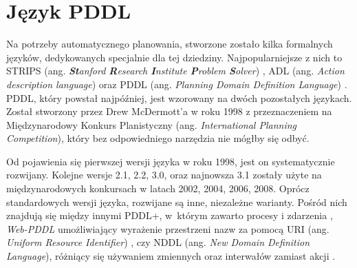 \section{Język PDDL}
\label{sec:jezykpddl}
Na potrzeby automatycznego planowania, stworzone zostało kilka formalnych języków, dedykowanych specjalnie dla tej dziedziny. Najpopularniejsze z nich to STRIPS (ang. \textit{\textbf{St}anford \textbf{R}esearch \textbf{I}nstitute \textbf{P}roblem \textbf{S}olver}) \cite{strips}, ADL (ang. \textit{Action description language}) \cite{adl} oraz PDDL (ang. \textit{Planning Domain Definition Language}) \cite{pddl}. PDDL, który powstał najpóźniej, jest wzorowany na dwóch pozostałych językach. Został stworzony przez Drew McDermott'a w roku 1998 z przeznaczeniem na Międzynarodowy Konkurs Planistyczny (ang. \textit{International Planning Competition}), który bez odpowiedniego narzędzia nie mógłby się odbyć.

Od pojawienia się pierwszej wersji języka w roku 1998, jest on systematycznie rozwijany. Kolejne wersje 2.1, 2.2, 3.0, oraz najnowsza 3.1 zostały użyte na międzynarodowych konkursach w latach 2002, 2004, 2006, 2008. Oprócz standardowych wersji języka, rozwijane są inne, niezależne warianty. Pośród nich znajdują się między innymi PDDL+, w~którym zawarto procesy i zdarzenia \cite{pddlplus}, \emph{Web-PDDL} umożliwiający wyrażenie przestrzeni nazw za pomocą URI (ang. \textit{Uniform Resource Identifier}) \cite{webpddl}, czy NDDL (ang. \textit{New Domain Definition Language}), różniący się używaniem zmiennych oraz interwałów zamiast akcji \cite{npdl}.

